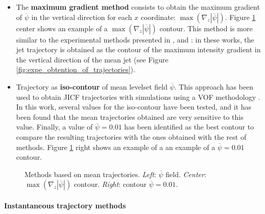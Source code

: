 \begin{itemize}

	\item The \textbf{maximum gradient method} consists to obtain the maximum gradient of $\overline{\psi}$ in the vertical direction for each $x$ coordinate: $\max \left( \nabla_z | \overline{\psi} | \right)$. Figure \ref{fig:trajectory_obtention_mean_methods_c_d} center shows an example of a $\max \left( \nabla_z | \overline{\psi} | \right)$ contour. This method is more similar to the experimental methods presented in ,  and : in these works, the jet trajectory is obtained as the contour of the maximum intensity gradient in the vertical direction of the mean jet (see Figure \ref{fig:expe_obtention_of_trajectories}).
	
	\item Trajectory as \textbf{iso-contour} of mean levelset field $\overline{\psi}$. This approach has been used to obtain JICF trajectories with simulations using a VOF methodology . In this work, several values for the iso-contour have been tested, and it has been found that the mean trajectories obtained are very sensitive to this value. Finally, a value of $\overline{\psi} = 0.01$ has been identified as the best contour to compare the resulting trajectories with the ones obtained with the rest of methods. Figure \ref{fig:trajectory_obtention_mean_methods_c_d} right shows an example of a an example of a $\overline{\psi} = 0.01$ contour.


\end{itemize}

\begin{figure}[ht]
     \centering
     \caption[Methods based on mean trajectories]{Methods based on mean trajectories. \textsl{Left}: $\overline{\psi}$ field. \textsl{Center}: $\max \left( \nabla_z | \overline{\psi} | \right)$ contour. \textsl{Right}: contour $\overline{\psi} = 0.01$.}
      \label{fig:trajectory_obtention_mean_methods_c_d}
\end{figure}

\vspace*{-0.2in}

\paragraph*{Instantaneous trajectory methods}

